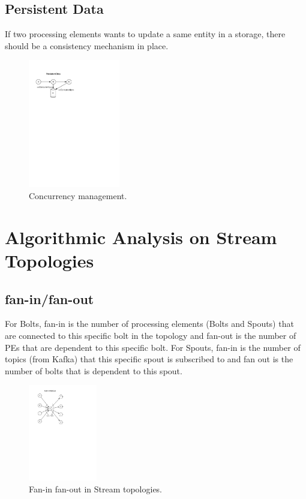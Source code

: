 \subsection{Persistent Data}

If two processing elements wants to update a same entity in a storage, there should be a consistency mechanism in place. 


\begin{figure}[H]
	\begin{center}
		\includegraphics[width=4cm]{images/persistence}
		\caption{Concurrency management.}
		\label{fig:persistence}
	\end{center}
\end{figure}

\section{Algorithmic Analysis on Stream Topologies}

\subsection{fan-in/fan-out}

For Bolts, fan-in is the number of processing elements (Bolts and Spouts) that are connected to this specific bolt in the topology and fan-out is the number of PEs that are dependent to this specific bolt. For Spouts, fan-in is the number of topics (from Kafka) that this specific spout is subscribed to and fan out is the number of bolts that is dependent to this spout.

\begin{figure}[H]
	\begin{center}
		\includegraphics[width=3cm]{images/fan-in-out}
		\caption{Fan-in fan-out in Stream topologies.}
		\label{fig:fan}
	\end{center}
\end{figure}

